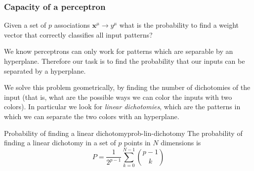\documentclass[12pt]{extarticle}
\renewcommand{\vec}[1]{\bm{#1}}
\begin{document}
\subsubsection{Capacity of a perceptron}
Given a set of $p$ associations $\vec x^\mu \to y^\mu$ what is the probability to find
a weight vector that correctly classifies all input patterns?

We know perceptrons can only work for patterns which are separable by an hyperplane.
Therefore our task is to find the probability that our inputs can be separated by a hyperplane.

We solve this problem geometrically, by finding the number of dichotomies of the input (that is,
what are the possible ways we can color the inputs with two colors).
In particular we look for \emph{linear dichotomies}, which are the patterns in which we can separate
the two colors with an hyperplane.

\begin{proposition}{Probability of finding a linear dichotomy}{prob-lin-dichotomy}
	The probability of finding a linear dichotomy in a set of $p$ points in $N$ dimensions is
	\begin{equation}
		P = \frac{1}{2^{p-1}} \sum_{k = 0}^{N -1} \binom{p-1}{k}
		\label{eq:prob-lin-dichotomy}
	\end{equation}
\end{proposition}
\end{document}
